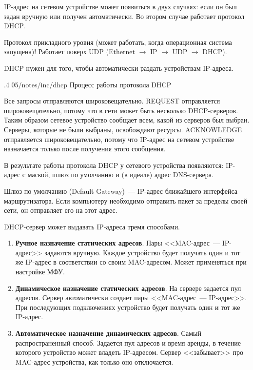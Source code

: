 IP-адрес на сетевом устройстве может появиться в двух случаях: если он был
задан вручную или получен автоматически. Во втором случае работает протокол
DHCP.

Протокол прикладного уровня (может работать, когда операционная система запущена)! Работает поверх UDP (Ethernet $\rightarrow$ IP $\rightarrow$ UDP $\rightarrow$ DHCP).

DHCP нужен для того, чтобы автоматически раздать устройствам IP-адреса.

\image
{.4\textwidth}
{05/notes/inc/dhcp}
{Процесс работы протокола DHCP}

Все запросы отправляются широковещательно. REQUEST отправляется широковещательно, потому что в сети может быть несколько DHCP-серверов. Таким образом сетевое устройство сообщает всем, какой из серверов был выбран. Серверы, которые не были выбраны, освобождают ресурсы. ACKNOWLEDGE отправляется широковещательно, потому что IP-адрес на сетевом устройстве назначается только после получения этого сообщения.

В результате работы протокола DHCP у сетевого устройства появляются: IP-адрес с маской, шлюз по умолчанию и (в идеале) адрес DNS-сервера.

\begin{dd}
    Шлюз по умолчанию (Default Gateway)~--- IP-адрес ближайшего интерфейса маршрутизатора. Если компьютеру необходимо отправить пакет за пределы своей сети, он отправляет его на этот адрес.
\end{dd}

DHCP-сервер может выдавать IP-адреса тремя способами.

\begin{enumerate}
    \item \textbf{Ручное назначение статических адресов}. Пары <<MAC-адрес~--- IP-адрес>> задаются вручную. Каждое устройство будет получать один и тот же IP-адрес в соответствии со своим MAC-адресом. Может применяться при настройке МФУ.
    \item \textbf{Динамическое назначение статических адресов}. На сервере задается пул адресов. Сервер автоматически создает пары <<MAC-адрес~--- IP-адрес>>. При последующих подключениях устройство будет получать один и тот же IP-адрес.
    \item \textbf{Автоматическое назначение динамических адресов}. Самый распространенный способ. Задается пул адресов и время аренды, в течение которого устройство может владеть IP-адресом. Сервер <<забывает>> про MAC-адрес устройства, как только оно отключается.
\end{enumerate}

